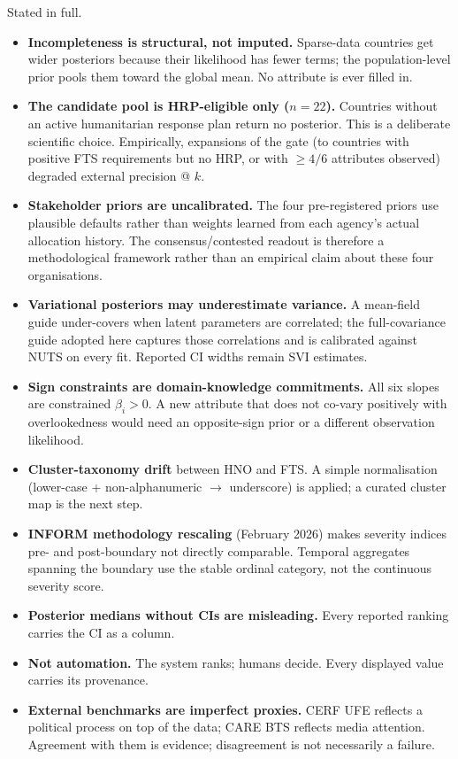 \documentclass[11pt,a4paper]{article}
\begin{document}
Stated in full.
\begin{itemize}[leftmargin=1.2em,itemsep=1pt,topsep=2pt]
  \item \textbf{Incompleteness is structural, not imputed.} Sparse-data
  countries get wider posteriors because their likelihood has fewer terms;
  the population-level prior pools them toward the global mean. No attribute
  is ever filled in.
  \item \textbf{The candidate pool is HRP-eligible only ($n = 22$).} Countries
  without an active humanitarian response plan return no posterior. This is
  a deliberate scientific choice. Empirically, expansions of the gate (to
  countries with positive FTS requirements but no HRP, or with $\geq 4/6$
  attributes observed) degraded external precision @ $k$.
  \item \textbf{Stakeholder priors are uncalibrated.} The four pre-registered
  priors use plausible defaults rather than weights learned from each agency's
  actual allocation history. The consensus/contested readout is therefore a
  methodological framework rather than an empirical claim about these four
  organisations.
  \item \textbf{Variational posteriors may underestimate variance.} A
  mean-field guide under-covers when latent parameters are correlated; the
  full-covariance guide adopted here captures those correlations and is
  calibrated against NUTS on every fit. Reported CI widths remain SVI
  estimates.
  \item \textbf{Sign constraints are domain-knowledge commitments.} All six
  slopes are constrained $\beta_i > 0$. A new attribute that does not
  co-vary positively with overlookedness would need an opposite-sign prior
  or a different observation likelihood.
  \item \textbf{Cluster-taxonomy drift} between HNO and FTS. A simple
  normalisation (lower-case + non-alphanumeric $\to$ underscore) is applied;
  a curated cluster map is the next step.
  \item \textbf{INFORM methodology rescaling} (February 2026) makes severity
  indices pre- and post-boundary not directly comparable. Temporal aggregates
  spanning the boundary use the stable ordinal category, not the continuous
  severity score.
  \item \textbf{Posterior medians without CIs are misleading.} Every reported
  ranking carries the CI as a column.
  \item \textbf{Not automation.} The system ranks; humans decide. Every
  displayed value carries its provenance.
  \item \textbf{External benchmarks are imperfect proxies.} CERF UFE reflects
  a political process on top of the data; CARE BTS reflects media attention.
  Agreement with them is evidence; disagreement is not necessarily a failure.
\end{itemize}
\end{document}
